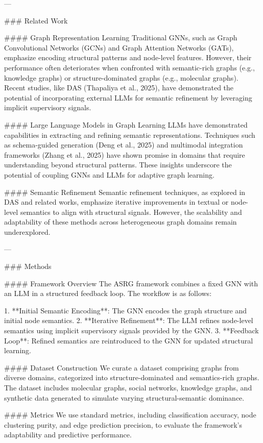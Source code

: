 ---

### Related Work  

#### Graph Representation Learning  
Traditional GNNs, such as Graph Convolutional Networks (GCNs) and Graph Attention Networks (GATs), emphasize encoding structural patterns and node-level features. However, their performance often deteriorates when confronted with semantic-rich graphs (e.g., knowledge graphs) or structure-dominated graphs (e.g., molecular graphs). Recent studies, like DAS (Thapaliya et al., 2025), have demonstrated the potential of incorporating external LLMs for semantic refinement by leveraging implicit supervisory signals.  

#### Large Language Models in Graph Learning  
LLMs have demonstrated capabilities in extracting and refining semantic representations. Techniques such as schema-guided generation (Deng et al., 2025) and multimodal integration frameworks (Zhang et al., 2025) have shown promise in domains that require understanding beyond structural patterns. These insights underscore the potential of coupling GNNs and LLMs for adaptive graph learning.  

#### Semantic Refinement  
Semantic refinement techniques, as explored in DAS and related works, emphasize iterative improvements in textual or node-level semantics to align with structural signals. However, the scalability and adaptability of these methods across heterogeneous graph domains remain underexplored.  

---

### Methods  

#### Framework Overview  
The ASRG framework combines a fixed GNN with an LLM in a structured feedback loop. The workflow is as follows:  

1. **Initial Semantic Encoding**: The GNN encodes the graph structure and initial node semantics.  
2. **Iterative Refinement**: The LLM refines node-level semantics using implicit supervisory signals provided by the GNN.  
3. **Feedback Loop**: Refined semantics are reintroduced to the GNN for updated structural learning.  

#### Dataset Construction  
We curate a dataset comprising graphs from diverse domains, categorized into structure-dominated and semantics-rich graphs. The dataset includes molecular graphs, social networks, knowledge graphs, and synthetic data generated to simulate varying structural-semantic dominance.  

#### Metrics  
We use standard metrics, including classification accuracy, node clustering purity, and edge prediction precision, to evaluate the framework's adaptability and predictive performance.  


